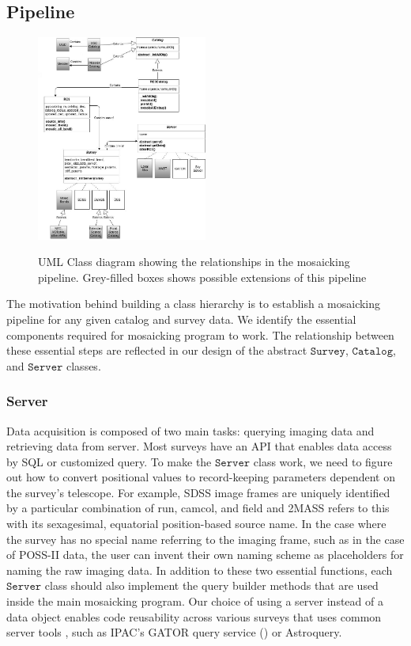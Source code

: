 \documentclass[5p]{elsarticle}
\begin{document}
	\subsection{Pipeline}
	\begin{figure}[h]
		\includegraphics[width=0.5\textwidth]{figures/hierarchy}
		\label{fig:hierarchy}
		\caption{UML Class diagram showing the relationships in the mosaicking pipeline. Grey-filled boxes shows possible extensions of this pipeline}
	\end{figure}
 	The motivation behind building a class hierarchy is to establish a mosaicking pipeline for any given catalog and survey data. We identify the essential components required for mosaicking program to work. The relationship between these essential steps are reflected in our design of the abstract $\texttt{Survey}$, $\texttt{Catalog}$, and $\texttt{Server}$ classes. 
 		\subsubsection{Server}
		Data acquisition is composed of two main tasks: querying imaging data and retrieving data from server. Most surveys have an API that enables data access by SQL or customized query. To make the $\texttt{Server}$ class work, we need to figure out how to convert positional values to record-keeping parameters dependent on the survey's telescope. For example, SDSS image frames are uniquely identified by a particular combination of  run, camcol, and field and 2MASS refers to this with its sexagesimal, equatorial position-based source name. In the case where the survey has no special name referring to the imaging frame, such as in the case of POSS-II data, the user can invent their own naming scheme as placeholders for naming the raw imaging data. In addition to these two essential functions, each $\texttt{Server}$ class should also implement the query builder methods that are used inside the main mosaicking program.  Our choice of using a server instead of a data object enables code reusability across various surveys that uses common server tools , such as IPAC's GATOR query service (\citealp{irsa}) or  Astroquery.
\end{document}
